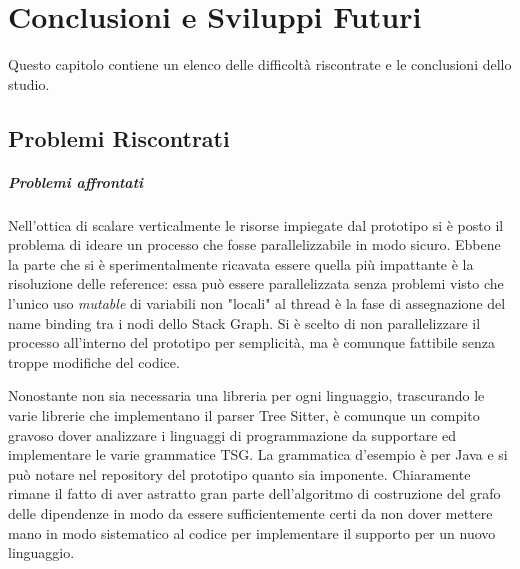 \chapter{Conclusioni e Sviluppi Futuri}

Questo capitolo contiene un elenco delle difficolt\`a riscontrate e le conclusioni dello studio.

\section{Problemi Riscontrati}

\paragraph{Problemi affrontati}

Nell'ottica di scalare verticalmente le risorse impiegate dal prototipo si \`e posto il problema di ideare un processo che fosse parallelizzabile in modo sicuro. Ebbene la parte che si \`e sperimentalmente ricavata essere quella pi\`u impattante \`e la risoluzione delle reference: essa pu\`o essere parallelizzata senza problemi visto che l'unico uso \emph{mutable} di variabili non "locali" al thread \`e la fase di assegnazione del name binding tra i nodi dello Stack Graph. Si \`e scelto di non parallelizzare il processo all'interno del prototipo per semplicit\`a, ma \`e comunque fattibile senza troppe modifiche del codice.


Nonostante non sia necessaria una libreria per ogni linguaggio, trascurando le varie librerie che implementano il parser Tree Sitter, \`e comunque un compito gravoso dover analizzare i linguaggi di programmazione da supportare ed implementare le varie grammatice TSG. La grammatica d'esempio \`e per Java e si pu\`o notare nel repository del prototipo quanto sia imponente. Chiaramente rimane il fatto di aver astratto gran parte dell'algoritmo di costruzione del grafo delle dipendenze in modo da essere sufficientemente certi da non dover mettere mano in modo sistematico al codice per implementare il supporto per un nuovo linguaggio.

